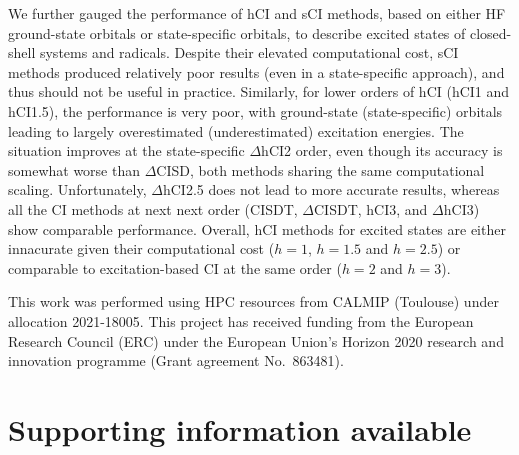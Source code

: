 \documentclass[aip,jcp,reprint,noshowkeys,superscriptaddress]{revtex4-1}
\begin{document}
We further gauged the performance of hCI and sCI methods, based on either HF ground-state orbitals or state-specific orbitals, to describe excited states of closed-shell systems and radicals.
Despite their elevated computational cost, sCI methods produced relatively poor results (even in a state-specific approach), and thus should not be useful in practice.
Similarly, for lower orders of hCI (hCI1 and hCI1.5), the performance is very poor,
with ground-state (state-specific) orbitals leading to largely overestimated (underestimated) excitation energies.
The situation improves at the state-specific $\Delta$hCI2 order, even though its accuracy is somewhat worse than $\Delta$CISD, both methods sharing the same computational scaling. 
Unfortunately, $\Delta$hCI2.5 does not lead to more accurate results, whereas all the CI methods at next next order (CISDT, $\Delta$CISDT, hCI3, and $\Delta$hCI3) show comparable performance.
Overall, hCI methods for excited states are either innacurate given their computational cost ($h=1$, $h=1.5$ and $h=2.5$) or comparable to excitation-based CI at the same order ($h=2$ and $h=3$).



\begin{acknowledgements}
This work was performed using HPC resources from CALMIP (Toulouse) under allocation 2021-18005.
This project has received funding from the European Research Council (ERC) under the European Union's Horizon 2020 research and innovation programme (Grant agreement No.~863481).
\end{acknowledgements}

\section*{Supporting information available}
\label{sec:SI}



\end{document}
